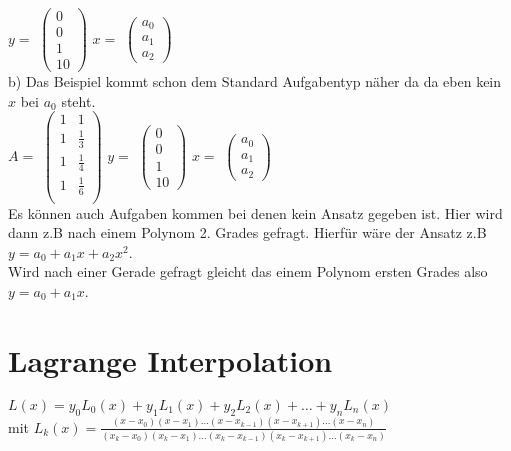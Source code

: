 \documentclass[a4paper, 11pt]{article}
\begin{document}
$y=$ $\begin{pmatrix}
	0\\0\\1\\10
\end{pmatrix}$
$x=$ $\begin{pmatrix}
	a_0\\a_1\\a_2
\end{pmatrix}$ \\
\newline b) Das Beispiel kommt schon dem Standard Aufgabentyp näher da da eben
kein $x$ bei $a_0$ steht.\\
\newline $A=$ $\begin{pmatrix}
	1 & 1\\
	1 & \frac{1}{3}\\
	1 & \frac{1}{4}\\
	1 & \frac{1}{6}\\
\end{pmatrix}$
$y=$ $\begin{pmatrix}
	0\\0\\1\\10
\end{pmatrix}$
$x=$ $\begin{pmatrix}
	a_0\\a_1\\a_2
\end{pmatrix}$ \\
\newline Es können auch Aufgaben kommen bei denen kein Ansatz gegeben ist. Hier
wird dann z.B nach einem Polynom 2. Grades gefragt. Hierfür wäre der Ansatz
z.B $y=a_0+a_1x+a_2x^2$. \\
Wird nach einer Gerade gefragt gleicht das einem Polynom ersten Grades also
$y=a_0+a_1x$.
\newpage
\section{Lagrange Interpolation}
$L(x) = y_0L_0(x) + y_1L_1(x) + y_2L_2(x)+\ldots +y_nL_n(x)$\\
\newline mit $L_k(x)=\frac{(x-x_0)(x-x_1)\ldots
(x-x_{k-1})(x-x_{k+1})\ldots(x-x_n)}{(x_k-x_0)(x_k-x_1)\ldots(x_k-x_{k-1})(x_k-x_{k+1})\ldots(x_k-x_n)}$\\
\end{document}

